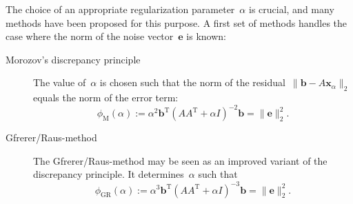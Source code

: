 \documentclass[a4paper,10pt]{amsart}
\newcommand{\trans}[1]{{#1}^{\text{T}}}      %
\renewcommand{\vec}[1]{\mathbf{\boldsymbol{#1}}}
\begin{document}
The choice of an appropriate regularization parameter~$\alpha$
is crucial,
and many methods have been proposed for this purpose.
A first set of methods handles the case where the norm of the
noise vector~$\vec{e}$ is known:
\begin{description}
  \item[Morozov's discrepancy principle]
    The value of~$\alpha$ is chosen such that the norm of the
    residual~${\| \vec{b} - A \vec{x}_\alpha \|_2}$ equals the
    norm of the error term:
    \begin{equation*}
      \phi_{\text{M}} (\alpha) :=
      \alpha^2 \trans{\vec{b}} (A \trans{A} + \alpha I)^{-2} \vec{b} =
      \| \vec{e} \|_2^2.
    \end{equation*}

  \item[Gfrerer/Raus-method]
    The Gfrerer/Raus-method may be seen as an improved variant of the
    discrepancy principle.
    It determines~$\alpha$ such that
    \begin{equation*}
      \phi_{\text{GR}} (\alpha) :=
      \alpha^3 \trans{\vec{b}} (A \trans{A} + \alpha I)^{-3} \vec{b} =
      \| \vec{e} \|_2^2.
    \end{equation*}

\end{description}
\end{document}
